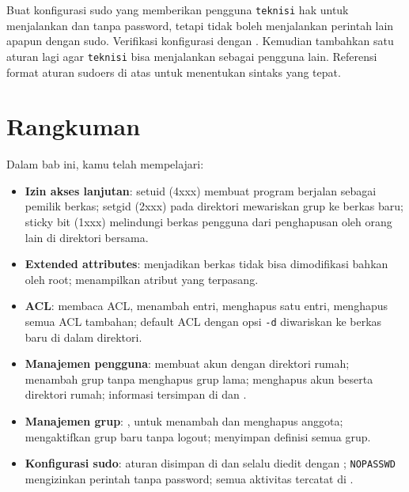 \begin{challengebox}
Buat konfigurasi sudo yang memberikan pengguna \texttt{teknisi} hak untuk menjalankan  dan  tanpa password, tetapi tidak boleh menjalankan perintah lain apapun dengan sudo. Verifikasi konfigurasi dengan . Kemudian tambahkan satu aturan lagi agar \texttt{teknisi} bisa menjalankan  sebagai pengguna lain. Referensi format aturan sudoers di atas untuk menentukan sintaks yang tepat.
\end{challengebox}

\section{Rangkuman}
\label{sec:file-user-summary}

Dalam bab ini, kamu telah mempelajari:

\begin{itemize}[noitemsep,topsep=2pt]
    \item \textbf{Izin akses lanjutan}: setuid (4xxx) membuat program berjalan sebagai pemilik berkas; setgid (2xxx) pada direktori mewariskan grup ke berkas baru; sticky bit (1xxx) melindungi berkas pengguna dari penghapusan oleh orang lain di direktori bersama.
    \item \textbf{Extended attributes}:  menjadikan berkas tidak bisa dimodifikasi bahkan oleh root;  menampilkan atribut yang terpasang.
    \item \textbf{ACL}:  membaca ACL,  menambah entri,  menghapus satu entri,  menghapus semua ACL tambahan; default ACL dengan opsi \texttt{-d} diwariskan ke berkas baru di dalam direktori.
    \item \textbf{Manajemen pengguna}:  membuat akun dengan direktori rumah;  menambah grup tanpa menghapus grup lama;  menghapus akun beserta direktori rumah; informasi tersimpan di  dan .
    \item \textbf{Manajemen grup}: ,  untuk menambah dan menghapus anggota;  mengaktifkan grup baru tanpa logout;  menyimpan definisi semua grup.
    \item \textbf{Konfigurasi sudo}: aturan disimpan di  dan selalu diedit dengan ; \texttt{NOPASSWD} mengizinkan perintah tanpa password; semua aktivitas tercatat di .
\end{itemize}

